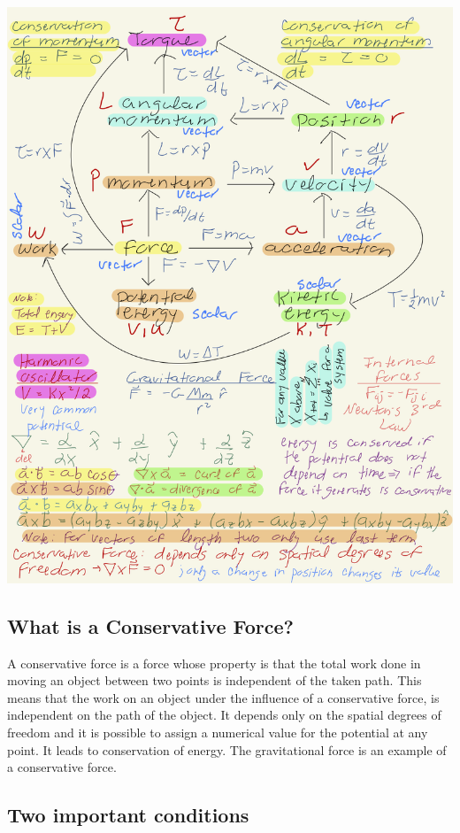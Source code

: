\documentclass[%
oneside,                 %
final,                   %
10pt]{article}
\begin{document}
\vspace{6mm}

\centerline{\includegraphics[width=0.8\linewidth]{figslides/ClassicalMechanicsJulie.png}}

\vspace{6mm}

\subsection*{What is a Conservative Force?}

A conservative force is a force whose property is that the total work
done in moving an object between two points is independent of the
taken path. This means that the work on an object under the influence
of a conservative force, is independent on the path of the object. It
depends only on the spatial degrees of freedom and it is possible to
assign a numerical value for the potential at any point. It leads to
conservation of energy. The gravitational force is an example of a
conservative force.

\subsection*{Two important conditions}
\end{document}
